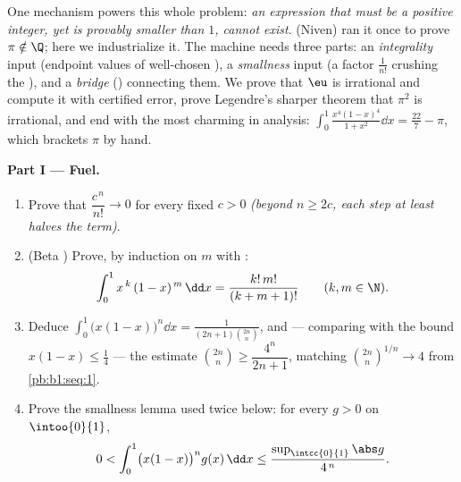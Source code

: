 \begin{problem}
\label{pb:b1:integration:1}
One mechanism powers this whole problem: \emph{an expression that
must be a positive integer, yet is provably smaller than $1$,
cannot exist}.  (Niven) ran it once to
prove $\pi \notin \Q$; here we industrialize it. The machine
needs three parts: an \emph{integrality} input (endpoint values
of well-chosen ), a \emph{smallness} input (a factor
$\frac{1}{n!}$ crushing the ), and a \emph{bridge}
() connecting them. We prove that $\eu$ is
irrational and compute it with certified error, prove Legendre's
sharper theorem that $\pi^2$ is irrational, and end with the
most charming  in analysis: $\int_0^1 \frac{x^4(1 -
x)^4}{1 + x^2}\dd x = \frac{22}{7} - \pi$, which brackets $\pi$
by hand.

\medskip
\noindent\textbf{Part I --- Fuel.}
\begin{enumerate}
  \item Prove that $\dfrac{c^{\,n}}{n!} \to 0$ for every fixed $c
        > 0$ \emph{(beyond $n \geq 2c$, each step at least halves
        the term)}.
  \item (Beta ) Prove, by induction on $m$ with
        :
        \[
        \int_0^1 x^{\,k}\,(1 - x)^{\,m}\,\dd x =
        \frac{k!\,m!}{(k + m + 1)!}
        \qquad (k, m \in \N).
        \]
  \item Deduce $\displaystyle\int_0^1 \bigl(x(1-x)\bigr)^n \dd x
        = \frac{1}{(2n+1)\binom{2n}{n}}$, and --- comparing with
        the bound $x(1 - x) \leq \frac14$ --- the estimate
        $\binom{2n}{n} \geq \dfrac{4^n}{2n+1}$, matching
        $\binom{2n}{n}^{1/n} \to 4$ from \cref{pb:b1:seq:1}.
  \item Prove the smallness lemma used twice below: for every
         $g > 0$ on $\intoo{0}{1}$,
        \[
        0 < \int_0^1 \bigl(x(1-x)\bigr)^n g(x)\,\dd x
        \leq \frac{\sup_{\intcc{0}{1}}\abs g}{4^{\,n}} .
        \]
\end{enumerate}


\end{problem}
